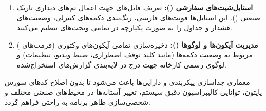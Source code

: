 \documentclass[a4paper, 10pt, twocolumn]{article}
\begin{document}
	\begin{enumerate}
		\item \textbf{استایل‌شیت‌های سفارشی ():} تعریف فایل‌های  جهت اعمال تم‌های دیداری تاریک صنعتی (). این استایل‌ها فونت‌های فارسی، رنگ‌بندی دکمه‌های کنترلی، وضعیت‌های هشدار و جداول را به صورت یکپارچه در تمامی ویجت‌های  تنظیم می‌کنند.
		\item \textbf{مدیریت آیکون‌ها و لوگوها ():} ذخیره‌سازی تمامی آیکون‌های وکتوری (فرمت‌های ) مربوط به وضعیت دکمه‌ها (مانند کلید توقف اضطراری، ضبط ویدیو، تنظیمات) و لوگوی رسمی کارخانه جهت درج در لایه‌بندی گزارش‌های  استخراج‌شده.
	\end{enumerate}
	
	
	معماری جداسازی پیکربندی و دارایی‌ها باعث می‌شود تا بدون اصلاح کدهای سورس پایتون، توانایی کالیبراسیون دقیق سیستم، تغییر آستانه‌ها در محیط‌های صنعتی مختلف و شخصی‌سازی ظاهر برنامه به راحتی فراهم گردد.
	\newpage
	
	
	\begin{LTR}
		\printbibliography[title={\rl{Refrences}}]
	\end{LTR}
	
\end{document}
